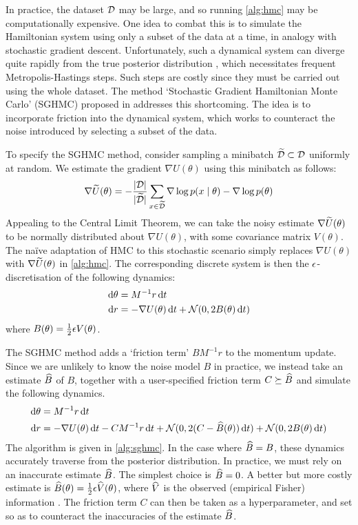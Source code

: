 In practice, the dataset $\mathcal{D}$ may be large, and so running \cref{alg:hmc} may be computationally expensive. One idea to combat this is to simulate the Hamiltonian system using only a subset of the data at a time, in analogy with stochastic gradient descent. Unfortunately, such a dynamical system can diverge quite rapidly from the true posterior distribution \cite{neal-hmc}, which necessitates frequent Metropolis-Hastings steps. Such steps are costly since they must be carried out using the whole dataset. The method `Stochastic Gradient Hamiltonian Monte Carlo' (SGHMC) proposed in \cite{sghmc} addresses this shortcoming. The idea is to incorporate friction into the dynamical system, which works to counteract the noise introduced by selecting a subset of the data.

To specify the SGHMC method, consider sampling a minibatch $\widetilde{\mathcal{D}} \subset \mathcal{D}$ uniformly at random. We estimate the gradient $\nabla U(\theta)$ using this minibatch as follows:
\begin{equation*}
    \nabla \widetilde U(\theta) = - \frac{\lvert\mathcal{D}\rvert}{\lvert\widetilde{\mathcal{D}}\rvert}\sum_{x \in \widetilde{\mathcal{D}}} \nabla \log p(x \mid \theta) - \nabla \log p(\theta)
\end{equation*}
Appealing to the Central Limit Theorem, we can take the noisy estimate $\nabla \widetilde U(\theta)$ to be normally distributed about $\nabla U(\theta)$, with some covariance matrix $V(\theta)$. The naïve adaptation of HMC to this stochastic scenario simply replaces $\nabla U(\theta)$ with $\nabla \widetilde U(\theta)$ in \cref{alg:hmc}. The corresponding discrete system is then the $\epsilon$-discretisation of the following dynamics:
\begin{align*}
    \dif\theta &= M^{-1}r \dif t \\
    \dif r &= - \nabla U(\theta) \dif t + \mc N(0, 2B(\theta) \dif t)
\end{align*}
where $B(\theta) = \frac 1 2 \epsilon V(\theta)$.

The SGHMC method adds a `friction term' $B M^{-1} r$ to the momentum update. Since we are unlikely to know the noise model $B$ in practice, we instead take an estimate $\widehat B$ of $B$, together with a user-specified friction term $C \succeq \widehat B$ and simulate the following dynamics.
\begin{align*}
    \dif\theta &= M^{-1}r \dif t \\
    \dif r &= - \nabla U(\theta) \dif t - CM^{-1}r \dif t + \mc N(0, 2(C - \wh B(\theta))\dif t) + \mc N(0, 2B(\theta) \dif t)
\end{align*}
The algorithm is given in \cref{alg:sghmc}. In the case where $\widehat B = B$, these dynamics accurately traverse from the posterior distribution. In practice, we must rely on an inaccurate estimate $\widehat B$. The simplest choice is $\widehat B = 0$. A better but more costly estimate is $\widehat B(\theta) = \frac 1 2 \epsilon \widehat V(\theta)$, where $\widehat V$ is the observed (empirical Fisher) information \cite{sgld-fisher}. The friction term $C$ can then be taken as a hyperparameter, and set so as to counteract the inaccuracies of the estimate $\widehat B$.

